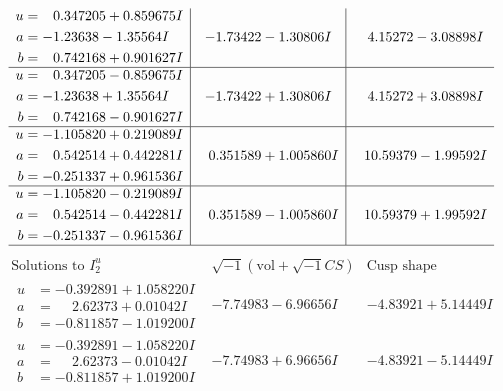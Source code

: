 \documentclass[1p]{elsarticle_modified}
\theoremstyle{definition}
\newcommand{\I}{\sqrt{-1}}
\begin{document}
$$\begin{array}{c|c|c}
\begin{aligned}
u &= \phantom{-}0.347205 + 0.859675 I \\
a &= -1.23638 - 1.35564 I \\
b &= \phantom{-}0.742168 + 0.901627 I\end{aligned}
 & -1.73422 - 1.30806 I & \phantom{-}4.15272 - 3.08898 I \\ \hline\begin{aligned}
u &= \phantom{-}0.347205 - 0.859675 I \\
a &= -1.23638 + 1.35564 I \\
b &= \phantom{-}0.742168 - 0.901627 I\end{aligned}
 & -1.73422 + 1.30806 I & \phantom{-}4.15272 + 3.08898 I \\ \hline\begin{aligned}
u &= -1.105820 + 0.219089 I \\
a &= \phantom{-}0.542514 + 0.442281 I \\
b &= -0.251337 + 0.961536 I\end{aligned}
 & \phantom{-}0.351589 + 1.005860 I & \phantom{-}10.59379 - 1.99592 I \\ \hline\begin{aligned}
u &= -1.105820 - 0.219089 I \\
a &= \phantom{-}0.542514 - 0.442281 I \\
b &= -0.251337 - 0.961536 I\end{aligned}
 & \phantom{-}0.351589 - 1.005860 I & \phantom{-}10.59379 + 1.99592 I\\
 \hline 
 \end{array}$$\newpage$$\begin{array}{c|c|c}  
\text{Solutions to }I^u_{2}& \I (\text{vol} + \sqrt{-1}CS) & \text{Cusp shape}\\
 \hline 
\begin{aligned}
u &= -0.392891 + 1.058220 I \\
a &= \phantom{-}2.62373 + 0.01042 I \\
b &= -0.811857 - 1.019200 I\end{aligned}
 & -7.74983 - 6.96656 I & -4.83921 + 5.14449 I \\ \hline\begin{aligned}
u &= -0.392891 - 1.058220 I \\
a &= \phantom{-}2.62373 - 0.01042 I \\
b &= -0.811857 + 1.019200 I\end{aligned}
 & -7.74983 + 6.96656 I & -4.83921 - 5.14449 I \\ \hline\begin{aligned}

\end{aligned}
\end{array}$$
\end{document}
